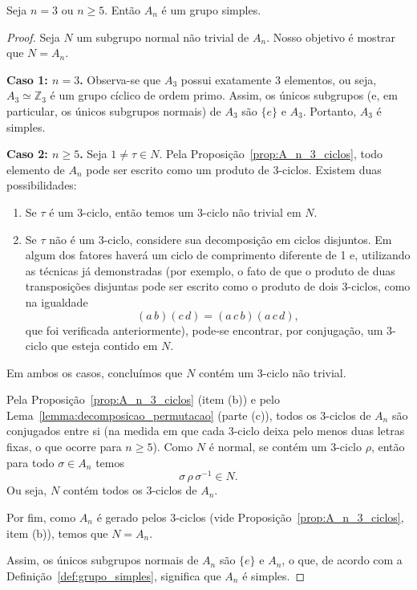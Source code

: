 \documentclass[11pt,openany]{book}
\newenvironment{novo}{
    \color{red}
}{}
\begin{document}
\begin{novo}
\begin{theorem}
\label{theo:grupo_alternado_simples}
    Seja $n=3$ ou $n \geq 5$. Então $A_n$ é um grupo simples.
\end{theorem}
\begin{proof}
    Seja \(N\) um subgrupo normal não trivial de \(A_n\). Nosso objetivo é mostrar que \(N = A_n\).

    \medskip

    \textbf{Caso 1: \(n=3\).}  
    Observa-se que \(A_3\) possui exatamente 3 elementos, ou seja, \(A_3 \simeq \mathbb{Z}_3\) é um grupo cíclico de ordem primo. Assim, os únicos subgrupos (e, em particular, os únicos subgrupos normais) de \(A_3\) são \(\{e\}\) e \(A_3\). Portanto, \(A_3\) é simples.

    \medskip

    \textbf{Caso 2: \(n\geq 5\).}  
    Seja \(1\neq \tau\in N\). Pela Proposição~\ref{prop:A_n_3_ciclos}, todo elemento de \(A_n\) pode ser escrito como um produto de \(3\)-ciclos. Existem duas possibilidades:

    \begin{enumerate}[label=\textbf{(\alph*)}]
        \item Se \(\tau\) é um \(3\)-ciclo, então temos um \(3\)-ciclo não trivial em \(N\).  
        \item Se \(\tau\) não é um \(3\)-ciclo, considere sua decomposição em ciclos disjuntos. Em algum dos fatores haverá um ciclo de comprimento diferente de 1 e, utilizando as técnicas já demonstradas (por exemplo, o fato de que o produto de duas transposições disjuntas pode ser escrito como o produto de dois \(3\)-ciclos, como na igualdade
        \[
        (a\,b)(c\,d) = (a\,c\,b)(a\,c\,d),
        \]
        que foi verificada anteriormente), pode-se encontrar, por conjugação, um \(3\)-ciclo que esteja contido em \(N\).  
    \end{enumerate}

    Em ambos os casos, concluímos que \(N\) contém um \(3\)-ciclo não trivial.

    Pela Proposição~\ref{prop:A_n_3_ciclos} (item (b)) e pelo Lema~\ref{lemma:decomposicao_permutacao} (parte (c)), todos os \(3\)-ciclos de \(A_n\) são conjugados entre si (na medida em que cada \(3\)-ciclo deixa pelo menos duas letras fixas, o que ocorre para \(n\ge5\)). Como \(N\) é normal, se contém um \(3\)-ciclo \(\rho\), então para todo \(\sigma\in A_n\) temos
    \[
    \sigma\,\rho\,\sigma^{-1} \in N.
    \]
    Ou seja, \(N\) contém todos os \(3\)-ciclos de \(A_n\).

    Por fim, como \(A_n\) é gerado pelos \(3\)-ciclos (vide Proposição~\ref{prop:A_n_3_ciclos}, item (b)), temos que \(N = A_n\).

    \medskip

    Assim, os únicos subgrupos normais de \(A_n\) são \(\{e\}\) e \(A_n\), o que, de acordo com a Definição~\ref{def:grupo_simples}, significa que \(A_n\) é simples.
\end{proof}

\end{novo}
\end{document}
